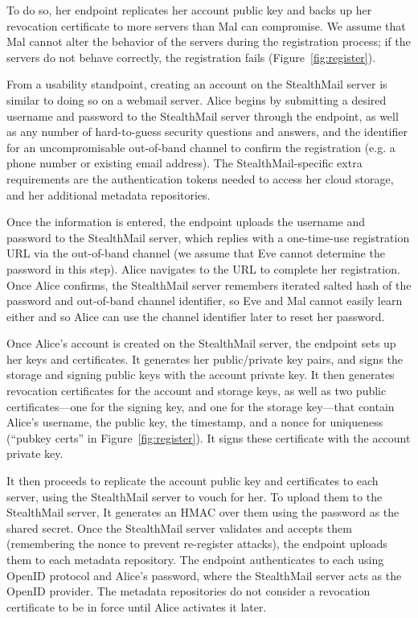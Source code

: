 To do so, her endpoint replicates her account public key and backs up her revocation certificate to more servers than Mal can compromise.  We assume that Mal cannot alter the behavior of the servers during the registration process; if the servers do not behave correctly, the registration fails (Figure~\ref{fig:register}).

From a usability standpoint, creating an account on the StealthMail server is similar to doing so on a webmail server.  Alice begins by submitting a desired username and password to the StealthMail server through the endpoint, as well as any number of hard-to-guess security questions and answers, and the identifier for an uncompromisable out-of-band channel to confirm the registration (e.g. a phone number or existing email address).  The StealthMail-specific extra requirements are the authentication tokens needed to access her cloud storage, and her additional metadata repositories.

Once the information is entered, the endpoint uploads the username and password to the StealthMail server, which replies with a one-time-use registration URL via the out-of-band channel (we assume that Eve cannot determine the password in this step).  Alice navigates to the URL to complete her registration.  Once Alice confirms, the StealthMail server remembers iterated salted hash of the password and out-of-band channel identifier, so Eve and Mal cannot easily learn either and so Alice can use the channel identifier later to reset her password.

Once Alice’s account is created on the StealthMail server, the endpoint sets up her keys and certificates.  It generates her public/private key pairs, and signs the storage and signing public keys with the account private key.  It then generates revocation certificates for the account and storage keys, as well as two public certificates---one for the signing key, and one for the storage key---that contain Alice’s username, the public key, the timestamp, and a nonce for uniqueness (``pubkey certs'' in Figure~\ref{fig:register}).  It signs these certificate with the account private key.

It then proceeds to replicate the account public key and certificates to each server, using the StealthMail server to vouch for her.  To upload them to the StealthMail server, It generates an HMAC over them using the password as the shared secret.  Once the StealthMail server validates and accepts them (remembering the nonce to prevent re-register attacks), the endpoint uploads them to each metadata repository.  The endpoint authenticates to each using OpenID protocol and Alice’s password, where the StealthMail server acts as the OpenID provider.  The metadata repositories do not consider a revocation certificate to be in force until Alice activates it later.

